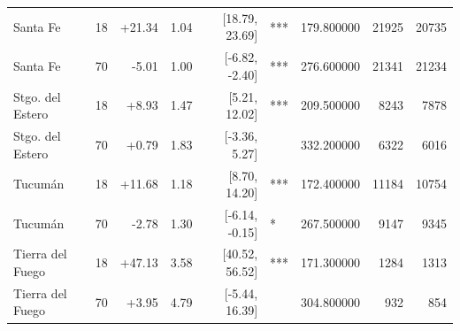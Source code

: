 \begin{table}[ht]
{\begin{tabular}{lrrrrlrrr}
Santa Fe & 18 & +21.34 & 1.04 & [18.79, 23.69] & *** & 179.800000 & 21925 & 20735 \\
Santa Fe & 70 & -5.01 & 1.00 & [-6.82, -2.40] & *** & 276.600000 & 21341 & 21234 \\
Stgo. del Estero & 18 & +8.93 & 1.47 & [5.21, 12.02] & *** & 209.500000 & 8243 & 7878 \\
Stgo. del Estero & 70 & +0.79 & 1.83 & [-3.36, 5.27] &  & 332.200000 & 6322 & 6016 \\
Tucumán & 18 & +11.68 & 1.18 & [8.70, 14.20] & *** & 172.400000 & 11184 & 10754 \\
Tucumán & 70 & -2.78 & 1.30 & [-6.14, -0.15] & * & 267.500000 & 9147 & 9345 \\
Tierra del Fuego & 18 & +47.13 & 3.58 & [40.52, 56.52] & *** & 171.300000 & 1284 & 1313 \\
Tierra del Fuego & 70 & +3.95 & 4.79 & [-5.44, 16.39] &  & 304.800000 & 932 & 854 \\
\bottomrule
\end{tabular}%
}
\end{table}

